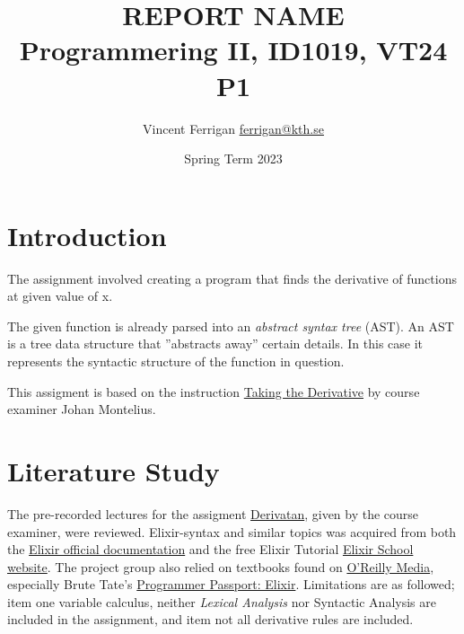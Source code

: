 \documentclass[a4paper,11pt]{article}
\begin{document}
\title{
    REPORT NAME
\\\small{Programmering II, ID1019, VT24 P1}
}
\author{Vincent Ferrigan \href{mailto:ferrigan@kth.se}{ferrigan@kth.se}}

\date{Spring Term 2023}

\maketitle

\section*{Introduction}
\label{sec:introduction}
The assignment involved creating a program that finds the derivative of functions at
given value of x.

The given function is already parsed into an \emph{abstract syntax tree} (AST).
An AST is a tree data structure that ''abstracts away'' certain details.
In this case it represents the syntactic structure of the function in question.

This assigment is based on the instruction
\href{https://people.kth.se/~johanmon/courses/id1020/seminars/derivative/derivative.pdfl}{Taking the Derivative}
by course examiner Johan Montelius.

\section{Literature Study}
The pre-recorded lectures for the assigment
\href{https://canvas.kth.se/courses/44911/assignments/275580}{Derivatan},
given by the course examiner, were reviewed.
Elixir-syntax and similar topics was acquired
from both the
\href{https://elixir-lang.org/docs.html}{Elixir official documentation}
and the free Elixir Tutorial
\href{https://elixirschool.com/en}{Elixir School
website}.
The project group also relied on textbooks found on
\href{https://learning.oreilly.com}{O'Reilly Media},
especially Brute Tate's
\href{https://learning.oreilly.com/library/view/programmer-passport-elixir/9781680509649/}{Programmer Passport: Elixir}.
Limitations are as followed; item one variable calculus,
neither \emph{Lexical Analysis} nor {Syntactic Analysis} are included in the assignment, and
item not all derivative rules are included.

\end{document}

